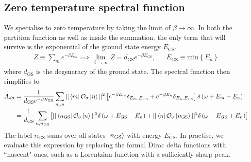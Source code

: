 \subsection{Zero temperature spectral function}
We specialise to zero temperature by taking the limit of \(\beta \to \infty\). In both the partition function as well as inside the summation, the only term that will survive is the exponential of the ground state energy \(E_\text{GS}\).
\begin{equation*}\begin{aligned}
	Z \equiv \sum_m e^{-\beta E_m} \implies \lim_{\beta \to \infty}Z = d_\text{GS} e^{-\beta E_\text{GS}}, && E_\text{GS} \equiv \text{min}\left\{ E_n \right\} 
\end{aligned}\end{equation*}
where \(d_\text{GS}\) is the degeneracy of the ground state. The spectral function then simplifies to
\begin{equation}\begin{aligned}
	\label{Gf_lk}
	A_{d\sigma} &= \frac{1}{d_\text{GS}e^{-\beta E_\text{GS}}}\sum_{m,n}||\bra{m}\mathcal{O}_{\sigma}\ket{n}||^2\left[e^{-\beta E_m}\delta_{E_m, E_\text{GS}} + e^{-\beta E_n}\delta_{E_n, E_\text{GS}}\right]\delta\left(\omega + E_m - E_n\right)\\
											 &= \frac{1}{d_\text{GS}}\sum_{n,n_\text{GS}}\left[||\bra{n_\text{GS}}\mathcal{O}_{\sigma}\ket{n}||^2\delta\left(\omega + E_\text{GS} - E_n\right) + ||\bra{n}\mathcal{O}_{\sigma}\ket{n_\text{GS}}||^2\delta\left(\omega - E_\text{GS} + E_n\right)\right]\\
\end{aligned}\end{equation}
The label \(n_\text{GS}\) sums over all states \(\ket{n_\text{GS}}\) with energy \(E_\text{GS}\). In practise, we evaluate this expression by replacing the formal Dirac delta functions with ``nascent" ones, such as a Lorentzian function with a sufficiently sharp peak.

